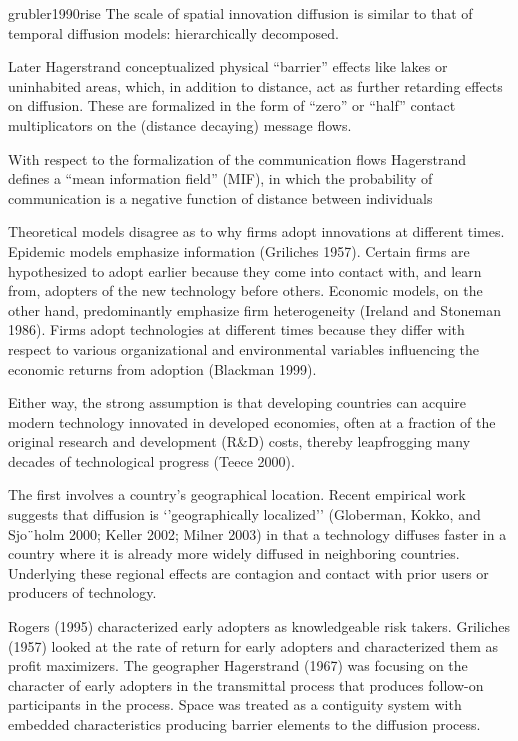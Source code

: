 \documentclass[
  authoryear,
  preprint,
  3p]{elsarticle}
\begin{document}
grubler1990rise The scale of spatial innovation diffusion is similar to
that of temporal diffusion models: hierarchically decomposed.

\citet{grubler1990rise} Later Hagerstrand conceptualized physical
``barrier'' effects like lakes or uninhabited areas, which, in addition
to distance, act as further retarding effects on diffusion. These are
formalized in the form of ``zero'' or ``half'' contact multiplicators on
the (distance decaying) message flows.

\citet{grubler1990rise} With respect to the formalization of the
communication flows Hagerstrand defines a ``mean information field''
(MIF), in which the probability of communication is a negative function
of distance between individuals

\citet{perkins2005international} Theoretical models disagree as to why
firms adopt innovations at different times. Epidemic models emphasize
information (Griliches 1957). Certain firms are hypothesized to adopt
earlier because they come into contact with, and learn from, adopters of
the new technology before others. Economic models, on the other hand,
predominantly emphasize firm heterogeneity (Ireland and Stoneman 1986).
Firms adopt technologies at different times because they differ with
respect to various organizational and environmental variables
influencing the economic returns from adoption (Blackman 1999).

Either way, the strong assumption is that developing countries can
acquire modern technology innovated in developed economies, often at a
fraction of the original research and development (R\&D) costs, thereby
leapfrogging many decades of technological progress (Teece 2000).

The first involves a country's geographical location. Recent empirical
work suggests that diffusion is `'geographically localized'' (Globerman,
Kokko, and Sjo¨holm 2000; Keller 2002; Milner 2003) in that a technology
diffuses faster in a country where it is already more widely diffused in
neighboring countries. Underlying these regional effects are contagion
and contact with prior users or producers of technology.

\citet{ding2010modeling} Rogers (1995) characterized early adopters as
knowledgeable risk takers. Griliches (1957) looked at the rate of return
for early adopters and characterized them as profit maximizers. The
geographer Hagerstrand (1967) was focusing on the character of early
adopters in the transmittal process that produces follow-on participants
in the process. Space was treated as a contiguity system with embedded
characteristics producing barrier elements to the diffusion process.
\end{document}
